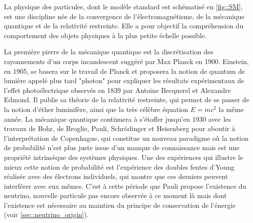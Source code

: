      La physique des particules, dont le modèle standard est schématisé en \autoref{fig::SM}, est une discipline née de la convergence de l'électromagnétisme, de la mécanique quantique et de la relativité restreinte. Elle a pour objectif la compréhension du comportement des objets physiques à la plus petite échelle possible.

      La première pierre de la mécanique quantique est la discrétisation des rayonnements d'un corps incandescent suggéré par Max Planck en 1900\cite{Planck1900}. Einstein, en 1905\cite{Einstein1905-quanta}, se basera sur le travail de Planck et proposera la notion de quantum de lumière appelé plus tard "photon" pour expliquer les résultats expérimentaux de l'effet photoélectrique observés en 1839 par Antoine Becquerel et Alexandre Edmond\cite{Becquerel1839}. Il publie sa théorie de la relativité restreinte\cite{Einstein1905-relat}, qui permet de se passer de la notion d'éther luminifère, ainsi que la très célèbre équation $E=mc^2$\cite{Einstein1905-emc2} la même année. La mécanique quantique continuera à s'étoffer jusqu'en 1930 avec les travaux de Bohr, de Broglie, Pauli, Schrödinger et Heisenberg pour aboutir à l'interprétation de Copenhague\cite{Heisenberg1949}, qui constitue un nouveau paradigme où la notion de probabilité n'est plus juste issue d'un manque de connaissance mais est une propriété intrinsèque des systèmes physiques. Une des expériences qui illustre le mieux cette notion de probabilité est l'expérience des doubles fentes d'Young réalisée avec des électrons individuels, qui montre que ces derniers peuvent interférer avec eux mêmes\cite{Merli1976,Rosa2012}. C'est à cette période que Pauli propose l'existence du neutrino\cite{Pauli1930}, nouvelle particule pas encore observée à ce moment là mais dont l'existence est nécessaire au maintien du principe de conservation de l'énergie (voir \autoref{sec::neutrino_origin}).

